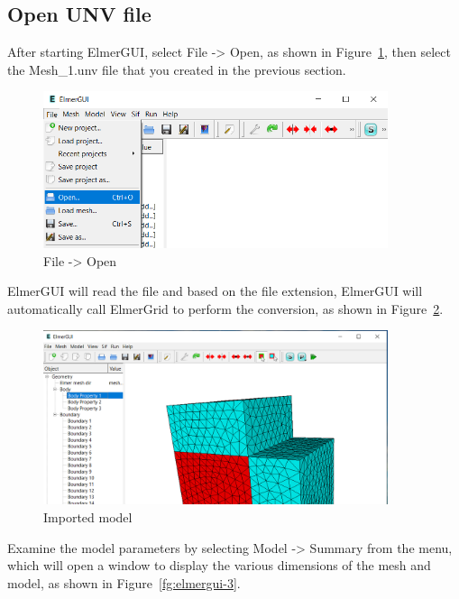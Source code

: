 \subsection{Open UNV file}

After starting ElmerGUI, select File -> Open, as shown in Figure~\ref{fg:elmergui-1}, then select the Mesh\_1.unv file that you created in the previous section.

\begin{figure}[H]
\centering
\includegraphics[width=0.9\textwidth]{elmergui-1}
\caption{File -> Open}\label{fg:elmergui-1}
\end{figure}

\newpage

ElmerGUI will read the file and based on the file extension, ElmerGUI will automatically call ElmerGrid to perform the conversion, as shown in Figure~\ref{fg:elmergui-2}.

\begin{figure}[H]
\centering
\includegraphics[width=0.9\textwidth]{elmergui-2}
\caption{Imported model}\label{fg:elmergui-2}
\end{figure}

Examine the model parameters by selecting Model -> Summary from the menu, which will open a window to display the various dimensions of the mesh and model, as shown in Figure~\ref{fg:elmergui-3}.

